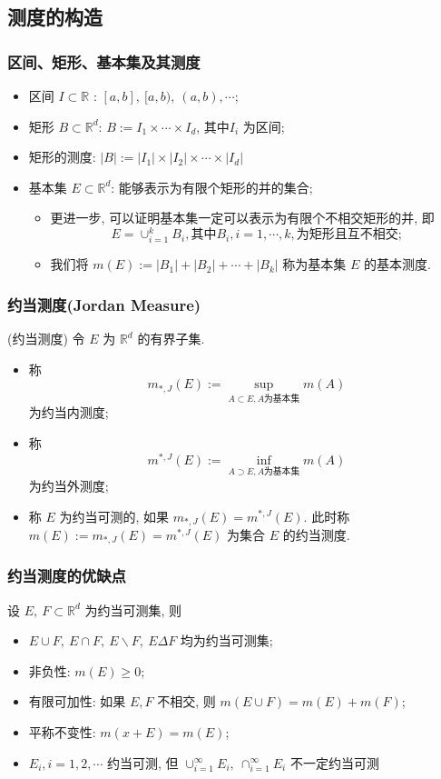 \subsection{测度的构造}
\begin{frame}
	\frametitle{区间、矩形、基本集及其测度}
	\begin{itemize}[<+-|alert@+>]
		\item 区间 $I\subset\mathbb{R}$ : $[a,b],\  [a,b),\  (a,b), \cdots$;
		\item 矩形 $B\subset\mathbb{R}^d$: $B:=I_1\times \cdots\times I_d$, 其中$I_i$ 为区间;
		\item 矩形的测度: $|B|:=|I_1|\times|I_2|\times\cdots\times|I_d|$
		\item 基本集 $E\subset\mathbb{R}^d$: 能够表示为有限个矩形的并的集合;
		\begin{itemize}[<+-|alert@+>]
			\item 更进一步, 可以证明基本集一定可以表示为有限个不相交矩形的并, 即
			\[E=\cup_{i=1}^kB_i, \mbox{其中} B_i, i=1,\cdots, k, \mbox{为矩形且互不相交};\]
			\item 我们将 $m(E):=|B_1|+|B_2|+\cdots+|B_k|$ 称为基本集 $E$ 的基本测度.
		\end{itemize}
	\end{itemize}
\end{frame}
\begin{frame}
	\frametitle{约当测度({\rm Jordan Measure})}
	\begin{defi}
		(约当测度) 令 $E$ 为 $\mathbb{R}^d$ 的有界子集.
		\begin{itemize}
			\item 称
			\[m_{*,J}(E):=\sup_{A\subset E, A\mbox{为基本集}}m(A)\]
			为约当内测度;
			\item 称
			\[m^{*,J}(E):=\inf_{A\supset E, A\mbox{为基本集}}m(A)\]
			为约当外测度;
			\item 称 $E$ 为约当可测的, 如果 $m_{*,J}(E)=m^{*,J}(E)$. 此时称 $m(E):=m_{*,J}(E)=m^{*,J}(E)$ 为集合 $E$ 的约当测度.
		\end{itemize}
	\end{defi}
\end{frame}
\begin{frame}
	\frametitle{约当测度的优缺点}
	设 $E,\  F\subset\mathbb{R}^d$ 为约当可测集, 则
	\begin{itemize}[<+-|alert@+>]
		\item $E\cup F,\  E\cap F,\  E\backslash F,\  E\Delta F$ 均为约当可测集;
		\item 非负性: $m(E)\geq 0$;
		\item 有限可加性: 如果 $E, F$ 不相交, 则 $m(E\cup F)=m(E)+m(F)$;
		\item 平称不变性: $m(x+E)=m(E)$;
		\item $E_i, i=1,2,\cdots$ 约当可测, 但 $\cup_{i=1}^\infty E_i, \  \cap_{i=1}^\infty E_i$ 不一定约当可测
	\end{itemize}
\end{frame}

